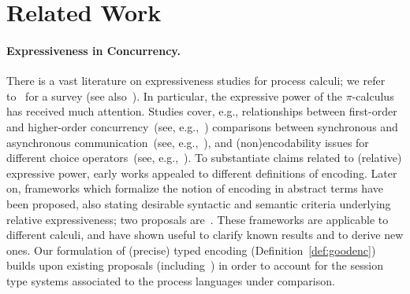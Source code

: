 \section{Related Work}

\paragraph{Expressiveness in Concurrency.}
There is a vast literature on expressiveness studies for process calculi;
we refer to~\cite{DBLP:journals/entcs/Parrow08} for a survey
(see also~\cite[\S\,2.3]{PerezPhD10}). 
In particular, the expressive power of the $\pi$-calculus has received much attention.
Studies cover, e.g., 
relationships between first-order and higher-order concurrency~(see, e.g.,~\cite{San923,San96int})
comparisons between 
synchronous and asynchronous communication~(see, e.g.,~\cite{Boudol92,Palamidessi03,BeauxisPV08}),
and
(non)encodability issues for different choice operators~(see, e.g.,~\cite{Nestmann00,DBLP:conf/esop/PetersNG13}).
To substantiate claims related to (relative) expressive power,
early works appealed to different definitions of encoding.
Later on, frameworks which formalize the notion of encoding 
in abstract terms
have been proposed, 
also stating desirable syntactic and semantic criteria underlying relative expressiveness; 
two proposals are~\cite{DBLP:journals/iandc/Gorla10,DBLP:journals/tcs/FuL10}. 
These frameworks are applicable to different calculi, and 
have shown useful to clarify known results and to derive new ones.
Our formulation of (precise) typed encoding (Definition~\ref{def:goodenc}) 
builds upon existing proposals (including~\cite{Palamidessi03,DBLP:journals/iandc/Gorla10,DBLP:conf/icalp/LanesePSS10})
in order to account for the session type systems
associated to the process languages under comparison.




